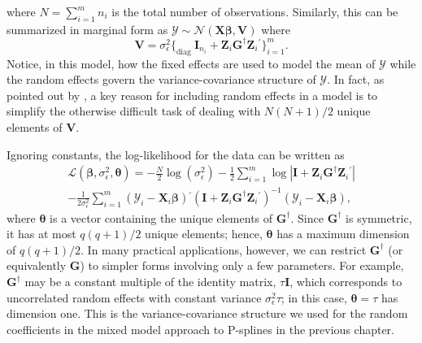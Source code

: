 \documentclass[cmfont,usenames,dvipsnames,leqno]{afit-etd}\usepackage[]{graphicx}\usepackage[]{color}
\newcommand{\loglik}{\mathscr{L}}
\newcommand{\trans}{\ensuremath{^\prime}}
\newcommand{\bc}[1]{\ensuremath{\bm{\mathcal{#1}}}}
\newcommand{\mc}[1]{\ensuremath{\mathcal{#1}}}
\newcommand{\X}{\ensuremath{\bm{X}}}
\newcommand{\Z}{\ensuremath{\bm{Z}}}
\begin{document}
  where $N = \sum_{i=1}^m n_i$ is the total number of observations. Similarly, this can be summarized in marginal form as $\bc{Y} \sim \mc{N}\left(\X\bm{\beta}, \bm{V}\right)$ where 
\begin{equation*}
  \bm{V} = \sigma_\epsilon^2\Big\lbrace_{\text{diag }} \bm{I}_{n_i} + \Z_i\bm{G}^\dagger\Z_i\trans \Big\rbrace_{i = 1}^m. 
\end{equation*}  
Notice, in this model, how the fixed effects are used to model the mean of $\bc{Y}$ while the random effects govern the variance-covariance structure of $\bc{Y}$. In fact, as pointed out by \citet{mcculloch_generalized_2008}, a key reason for including random effects in a model is to simplify the otherwise difficult task of dealing with $N(N+1)/2$ unique elements of $\bm{V}$. 

Ignoring constants, the log-likelihood for the data can be written as
\begin{multline}
\label{eqn:lmm-loglik}
  \loglik\left(\bm{\beta}, \sigma_\epsilon^2, \bm{\theta}\right) = -\frac{N}{2}\log(\sigma_\epsilon^2) - \frac{1}{2}\sum_{i = 1}^m\log\left|\bm{I} + \Z_i\bm{G}^\dagger\Z_i\trans\right| \\ - \frac{1}{2\sigma_\epsilon^2}\sum_{i = 1}^m \left(\bc{Y}_i - \X_i\bm{\beta}\right)\trans\left(\bm{I} + \Z_i\bm{G}^\dagger\Z_i\trans\right)^{-1}\left(\bc{Y}_i - \X_i\bm{\beta}\right),
\end{multline}
where $\bm{\theta}$ is a vector containing the unique elements of $\bm{G}^\dagger$. Since $\bm{G}^\dagger$ is symmetric, it has at most $q(q+1)/2$ unique elements; hence, $\bm{\theta}$ has a maximum dimension of $q(q+1)/2$. In many practical applications, however, we can restrict $\bm{G}^\dagger$ (or equivalently $\bm{G}$) to simpler forms involving only a few parameters. For example, $\bm{G}^\dagger$ may be a constant multiple of the identity matrix, $\tau\bm{I}$, which corresponds to uncorrelated random effects with constant variance $\sigma_\epsilon^2\tau$; in this case, $\bm{\theta} = \tau$ has dimension one. This is the variance-covariance structure we used for the random coefficients in the mixed model approach to P-splines in the previous chapter.
\end{document}
